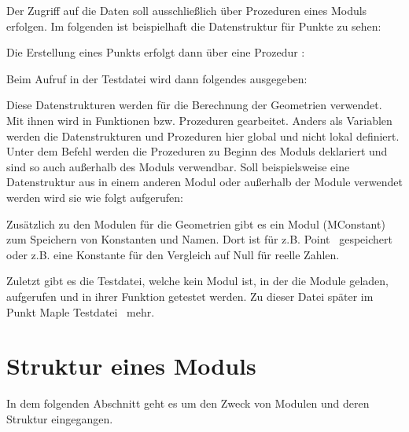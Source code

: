 \bigskip

Der Zugriff auf die Daten soll ausschließlich über Prozeduren eines Moduls erfolgen. Im folgenden ist beispielhaft die Datenstruktur für Punkte zu sehen:

\medskip

\MapleCommand{[MVPOINT,[x,y]]}

\medskip

Die Erstellung eines Punkts erfolgt dann über eine Prozedur :

\medskip


\medskip

Beim Aufruf in der Testdatei wird dann folgendes ausgegeben:
 
\medskip


\medskip

Diese Datenstrukturen werden für die Berechnung der Geometrien verwendet. Mit ihnen wird in Funktionen bzw. Prozeduren gearbeitet. Anders als Variablen werden die Datenstrukturen und Prozeduren hier global und nicht lokal definiert. Unter dem Befehl  werden die Prozeduren zu Beginn des Moduls deklariert und sind so auch außerhalb des Moduls verwendbar. Soll beispielsweise eine Datenstruktur aus  in einem anderen Modul oder außerhalb der Module  verwendet werden wird sie wie folgt aufgerufen:

\medskip


\medskip

Zusätzlich zu den Modulen für die Geometrien gibt es ein Modul (MConstant) zum Speichern von Konstanten und Namen. Dort ist für  z.B.  \glqq Point \grqq \, gespeichert oder z.B. eine Konstante für den Vergleich auf Null für reelle Zahlen.


Zuletzt gibt es die Testdatei, welche kein Modul ist, in der die Module geladen, aufgerufen und in ihrer Funktion getestet werden. Zu dieser Datei später im Punkt  Maple Testdatei \grqq \, mehr.


\section{Struktur eines Moduls}

In dem folgenden Abschnitt geht es um den Zweck von Modulen und deren Struktur eingegangen. \medskip

